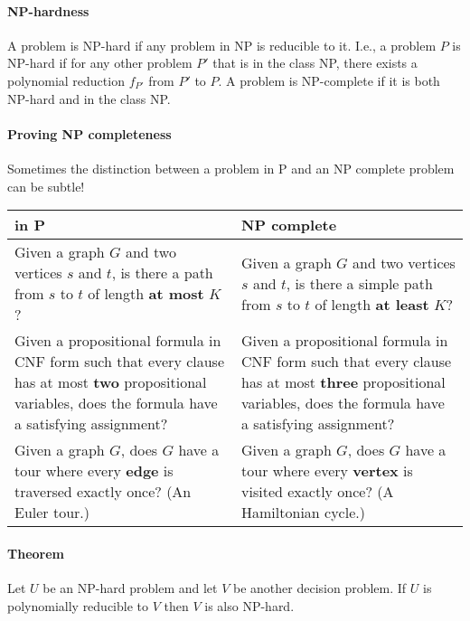 \paragraph{NP-hardness}
A problem is NP-hard if any problem in NP is reducible to it. I.e., a problem \(P\) is NP-hard if for any other problem \(P'\) that is in the class NP, there exists a polynomial reduction \(f_{P'}\) from \(P'\) to \(P\). A problem is NP-complete if it is both NP-hard and in the class NP. 
\paragraph{Proving NP completeness} 
Sometimes the distinction between a problem in P and an NP complete problem can be subtle!

\begin{tabularx}{0.9\textwidth} { 
  | >{\raggedright\arraybackslash}X 
  | >{\raggedright\arraybackslash}X | }
 \hline
 \textbf{in P} & \textbf{NP complete} \\
 \hline
Given a graph \(G\) and two vertices \(s\) and \(t\), is there a path from \(s\) to \(t\) of length \textbf{at most} \(K\)?  & Given a graph \(G\) and two vertices \(s\) and \(t\), is there a simple path from \(s\) to \(t\) of length \textbf{at least} \(K\)?  \\
\hline
Given a propositional formula in CNF form such that every clause has at most \textbf{two} propositional variables, does the formula have a satisfying assignment? & Given a propositional formula in CNF form such that every clause has at most \textbf{three} propositional variables, does the formula have a satisfying assignment? \\
\hline 
Given a graph \(G\), does \(G\) have a tour where every \textbf{edge} is traversed exactly once? (An Euler tour.) & Given a graph \(G\), does \(G\) have a tour where every \textbf{vertex} is visited exactly once? (A Hamiltonian cycle.) \\
\hline
\end{tabularx}

\paragraph{Theorem} 
Let \(U\) be an NP-hard problem and let \(V\) be another decision problem. If \(U\) is polynomially reducible to \(V\) then \(V\) is also NP-hard.
